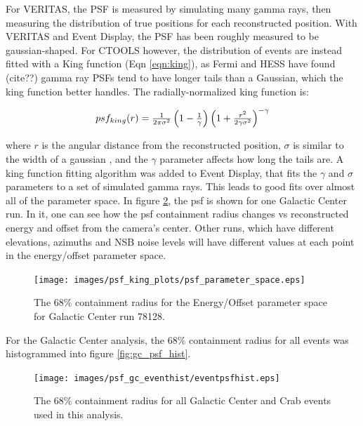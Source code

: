For VERITAS, the PSF is measured by simulating many gamma rays, then measuring the distribution of true positions for each reconstructed position.
With VERITAS and Event Display, the PSF has been roughly measured to be gaussian-shaped.
For CTOOLS however, the distribution of events are instead fitted with a King function (Eqn \ref{eqn:king}), as Fermi and HESS have found (cite??) gamma ray PSFs tend to have longer tails than a Gaussian, which the king function better handles.
The radially-normalized king function is:

\begin{equation} \label{eqn:king}
$$ psf_{king}(r) = \frac{1}{2 \pi \sigma^{2} } \left( 1 - \frac{1}{\gamma} \right) \left( 1 + \frac{ r^{2} }{ 2 \gamma \sigma^{2} } \right)^{-\gamma} $$
\end{equation}

where $r$ is the angular distance from the reconstructed position, $\sigma$ is similar to the width of a gaussian , and the $\gamma$ parameter affects how long the tails are.
A king function fitting algorithm was added to Event Display, that fits the $\gamma$ and $\sigma$ parameters to a set of simulated gamma rays.
This leads to good fits over almost all of the parameter space.
In figure \ref{fig:psf_paramspace}, the psf is shown for one Galactic Center run.
In it, one can see how the psf containment radius changes vs reconstructed energy and offset from the camera's center.
Other runs, which have different elevations, azimuths and NSB noise levels will have different values at each point in the energy/offset parameter space.

\begin{figure}[ht]
  \begin{center}
    \texttt{[image: images/psf\_king\_plots/psf\_parameter\_space.eps]}
    \caption[PSF Parameter Space]{The 68\% containment radius for the Energy/Offset parameter space for Galactic Center run 78128.}\label{fig:psf_paramspace}
  \end{center}
\end{figure}

For the Galactic Center analysis, the 68\% containment radius for all events was histogrammed into figure \ref{fig:gc_psf_hist}.

\begin{figure}[ht]
  \begin{center}
    \texttt{[image: images/psf\_gc\_eventhist/eventpsfhist.eps]}
    \caption[Crab and Galactic Center Event PSFs]{The 68\% containment radius for all Galactic Center and Crab events used in this analysis.}\label{fig:psf_paramspace}
  \end{center}
\end{figure}

